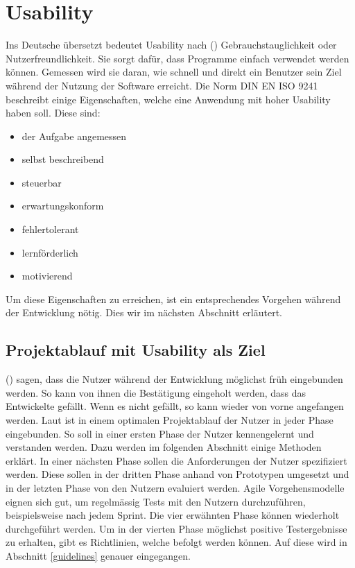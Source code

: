 \section{Usability}\label{usability}
Ins Deutsche übersetzt bedeutet Usability nach \citeauthor{usability} (\citeyear{usability}) Gebrauchstauglichkeit oder Nutzerfreundlichkeit.
Sie sorgt dafür, dass Programme einfach verwendet werden können.
Gemessen wird sie daran, wie schnell und direkt ein Benutzer sein Ziel während der Nutzung der Software erreicht.
Die Norm DIN EN ISO 9241 beschreibt einige Eigenschaften, welche eine Anwendung mit hoher Usability haben soll.
Diese sind:
\begin{itemize}
   \item der Aufgabe angemessen
   \item selbst beschreibend
   \item steuerbar
   \item erwartungskonform
   \item fehlertolerant
   \item lernförderlich
   \item motivierend
\end{itemize}
Um diese Eigenschaften zu erreichen, ist ein entsprechendes Vorgehen während der Entwicklung nötig.
Dies wir im nächsten Abschnitt erläutert.


\subsection{Projektablauf mit Usability als Ziel}
\citeauthor{usability} (\citeyear{usability}) sagen, dass die Nutzer während der Entwicklung möglichst früh eingebunden werden.
So kann von ihnen die Bestätigung eingeholt werden, dass das Entwickelte gefällt.
Wenn es nicht gefällt, so kann wieder von vorne angefangen werden.
Laut \citeauthor{usability} ist in einem optimalen Projektablauf der Nutzer in jeder Phase eingebunden.
So soll in einer ersten Phase der Nutzer kennengelernt und verstanden werden.
Dazu werden im folgenden Abschnitt einige Methoden erklärt.
In einer nächsten Phase sollen die Anforderungen der Nutzer spezifiziert werden.
Diese sollen in der dritten Phase anhand von Prototypen umgesetzt und in der letzten Phase von den Nutzern evaluiert werden.
Agile Vorgehensmodelle eignen sich gut, um regelmässig Tests mit den Nutzern durchzuführen, beispielsweise nach jedem Sprint.
Die vier erwähnten Phase können wiederholt durchgeführt werden.
Um in der vierten Phase möglichst positive Testergebnisse zu erhalten, gibt es Richtlinien, welche befolgt werden können.
Auf diese wird in Abschnitt \ref{guidelines} genauer eingegangen.


